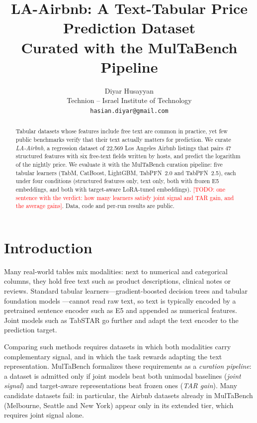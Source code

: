 \documentclass{article}
\title{LA-Airbnb: A Text-Tabular Price Prediction Dataset\\Curated with the MulTaBench Pipeline}
\author{
  Diyar Husayyan \\
  Technion -- Israel Institute of Technology \\
  \texttt{hasian.diyar@gmail.com}
}
\newcommand{\todo}[1]{\textcolor{red}{[TODO: #1]}}
\begin{document}
\maketitle

\begin{abstract}
Tabular datasets whose features include free text are common in practice, yet few public benchmarks verify that
their text actually matters for prediction. We curate \emph{LA-Airbnb}, a regression dataset of 22,569 Los Angeles
Airbnb listings that pairs 47 structured features with six free-text fields written by hosts, and predict the
logarithm of the nightly price. We evaluate it with the MulTaBench curation pipeline: five tabular learners (TabM,
CatBoost, LightGBM, TabPFN~2.0 and TabPFN~2.5), each under four conditions (structured features only, text only,
both with frozen E5 embeddings, and both with target-aware LoRA-tuned embeddings). \todo{one sentence with the verdict:
how many learners satisfy joint signal and TAR gain, and the average gains}. Data, code and per-run results are public.
\end{abstract}

\section{Introduction}

Many real-world tables mix modalities: next to numerical and categorical columns, they hold free text such as product
descriptions, clinical notes or reviews. Standard tabular learners---gradient-boosted decision trees
\cite{chen2016xgboost,prokhorenkova2018catboost,ke2017lightgbm} and tabular foundation models
\cite{hollmann2025accurate,grinsztajn2025tabpfn25,qu2025tabicl}---cannot read raw text, so text is typically encoded
by a pretrained sentence encoder such as E5 \cite{wang2022e5} and appended as numerical features. Joint models such as
TabSTAR \cite{arazi2025tabstar} go further and adapt the text encoder to the prediction target.

Comparing such methods requires datasets in which both modalities carry complementary signal, and in which the task
rewards adapting the text representation. MulTaBench \cite{arazi2026multabench} formalizes these requirements as a
\emph{curation pipeline}: a dataset is admitted only if joint models beat both unimodal baselines (\emph{joint signal})
and target-aware representations beat frozen ones (\emph{TAR gain}). Many candidate datasets fail: in particular, the
Airbnb datasets already in MulTaBench (Melbourne, Seattle and New York) appear only in its extended tier, which
requires joint signal alone.
\end{document}
